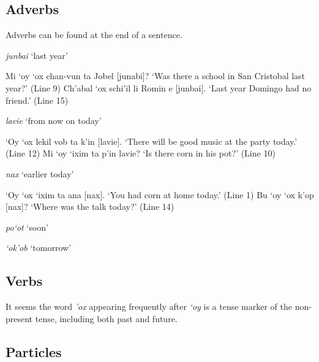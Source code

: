 \documentclass[12pt]{article}
\newcommand*{\form}[1]{\emph{#1}}
\newcommand{\translate}[1]{`#1'}
\def\\{}%
\begin{document}
\subsection{Adverbs}

Adverbs can be found at the end of a sentence.

\begin{exe}
    \ex \form{junbai} \translate{last year}
    \begin{xlist}
        \ex Mi `oy `ox chan-vun ta Jobel [junabi]? \\
        \translate{Was there a school in San Cristobal last year?} (Line 9)
        \ex Ch'abal `ox schi'il li Romin e [junbai]. \\
        \translate{Last year Domingo had no friend.} (Line 15)
    \end{xlist}

    \ex \form{lavie} \translate{from now on today}
    \begin{xlist}
        \ex `Oy `ox lekil vob ta k'in [lavie]. \\
        \translate{There will be good music at the party today.} (Line 12)
        \ex Mi `oy `ixim ta p'in lavie? \\
        \translate{Is there corn in his pot?} (Line 10)
    \end{xlist}
    
    \ex \form{nax} \translate{earlier today}
    \begin{xlist}
        \ex `Oy `ox `ixim ta ana [nax]. \\
        \translate{You had corn at home today.} (Line 1)
        \ex Bu `oy `ox k'op [nax]? \\
        \translate{Where was the talk today?} (Line 14)
    \end{xlist}

    \ex \form{po`ot} \translate{soon} 

    \ex \form{`ok'ob} \translate{tomorrow}
\end{exe}

\subsection{Verbs} 

It seems the word \form{'ox} appearing frequently after \form{`oy} 
is a tense marker of the non-present tense,
including both past and future.

\subsection{Particles}
\end{document}
